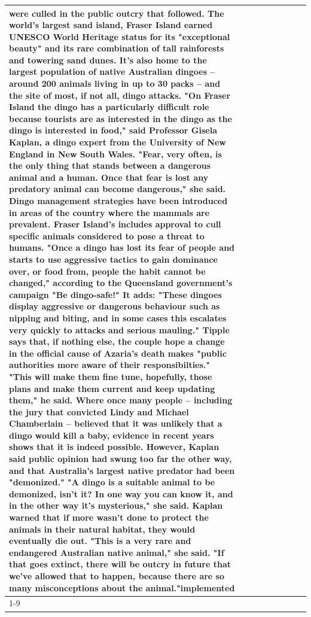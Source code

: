 \begin{table}[H]
\begin{tabular}{lllrlllll}
were culled in the public outcry that followed. The world's largest sand island, Fraser Island earned UNESCO World Heritage status for its "exceptional beauty" and its rare combination of tall rainforests and towering sand dunes. It's also home to the largest population of native Australian dingoes -- around 200 animals living in up to 30 packs -- and the site of most, if not all, dingo attacks. "On Fraser Island the dingo has a particularly difficult role because tourists are as interested in the dingo as the dingo is interested in food," said Professor Gisela Kaplan, a dingo expert from the University of New England in New South Wales. "Fear, very often, is the only thing that stands between a dangerous animal and a human. Once that fear is lost any predatory animal can become dangerous," she said. Dingo management strategies have been introduced in areas of the country where the mammals are prevalent. Fraser Island's includes approval to cull specific animals considered to pose a threat to humans. "Once a dingo has lost its fear of people and starts to use aggressive tactics to gain dominance over, or food from, people the habit cannot be changed," according to the Queensland government's campaign "Be dingo-safe!" It adds: "These dingoes display aggressive or dangerous behaviour such as nipping and biting, and in some cases this escalates very quickly to attacks and serious mauling." Tipple says that, if nothing else, the couple hope a change in the official cause of Azaria's death makes "public authorities more aware of their responsibilties." "This will make them fine tune, hopefully, those plans and make them current and keep updating them," he said. Where once many people -- including the jury that convicted Lindy and Michael Chamberlain -- believed that it was unlikely that a dingo would kill a baby, evidence in recent years shows that it is indeed possible. However, Kaplan said public opinion had swung too far the other way, and that Australia's largest native predator had been "demonized." "A dingo is a suitable animal to be demonized, isn't it? In one way you can know it, and in the other way it's mysterious," she said. Kaplan warned that if more wasn't done to protect the animals in their natural habitat, they would eventually die out. "This is a very rare and endangered Australian native animal," she said. "If that goes extinct, there will be outcry in future that we've allowed that to happen, because there are so many misconceptions about the animal."implemented \\
\cline{1-9}

\end{tabular}
\end{table}
